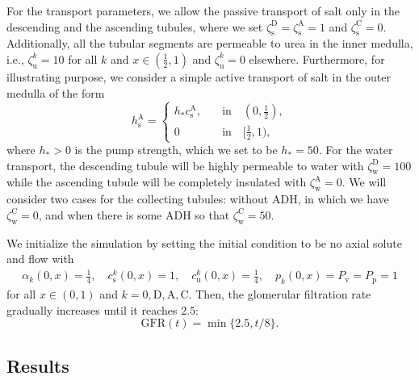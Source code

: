 \documentclass{article}
\begin{document}
For the transport parameters, we allow the passive transport of salt only in the descending and the ascending tubules, where we set $\zeta_{\mathrm{s}}^\mathrm{D} = \zeta_{\mathrm{s}}^\mathrm{A} = 1$ and $\zeta_{\mathrm{s}}^\mathrm{C} = 0$.
Additionally, all the tubular segments are permeable to urea in the inner medulla, i.e., $\zeta_{\mathrm{u}}^k = 10$ for all $k$ and $x\in (\frac{1}{2},1)$ and $\zeta_{\mathrm{u}}^k =0$ elsewhere.
Furthermore, for illustrating purpose, we consider a simple active transport of salt in the outer medulla of the form
    \begin{equation}
        h_\mathrm{s}^\mathrm{A} = \begin{cases}
            h_*c_\mathrm{s}^\mathrm{A},\quad  &\text{in}\quad (0,\frac{1}{2}),\\
            0\quad &\text{in}\quad [\frac{1}{2},1),
        \end{cases}
    \end{equation}
    where $h_*>0$ is the pump strength, which we set to be $h_*=50$.
For the water transport, the descending tubule will be highly permeable to water with $\zeta_\mathrm{w}^\mathrm{D} = 100$ while the ascending tubule will be completely insulated with $\zeta_\mathrm{w}^\mathrm{A} = 0$. 
We will consider two cases for the collecting tubules: without ADH, in which we have $\zeta_{\mathrm{w}}^\mathrm{C} = 0$, and when there is some ADH so that $\zeta_{\mathrm{w}}^\mathrm{C} = 50$.

We initialize the simulation by setting the initial condition to be no axial solute and flow with 
\begin{gather}
    \alpha_k(0,x) = \frac{1}{4},\quad
    c_\mathrm{s}^k(0,x) = 1,\quad
    c_{\mathrm{u}}^k(0,x) = \frac{1}{4},\quad
    p_k(0,x) = P_\mathrm{v} = P_{\mathrm{p}} = 1   
\end{gather}
    for all $x\in (0,1)$ and $k=0,\mathrm{D},\mathrm{A},\mathrm{C}$.
Then, the glomerular filtration rate gradually increases until it reaches $2.5$:
\begin{equation}
    \mathrm{GFR}(t) = \min\{2.5, t/8\}.
\end{equation}

\subsection{Results}
\end{document}

